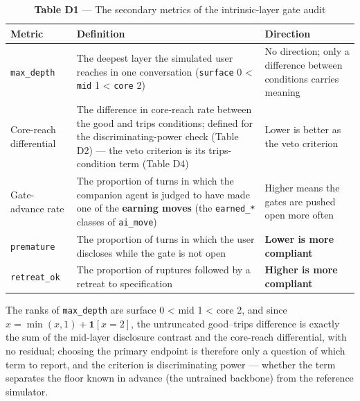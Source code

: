 \documentclass[letterpaper]{article}
\begin{document}
\begin{table}[t]
\centering\footnotesize
\setlength{\tabcolsep}{4pt}
\caption{\textbf{Table D1} --- The secondary metrics of the intrinsic-layer gate audit}
\begin{tabular}{@{}>{\raggedright\arraybackslash}p{}>{\raggedright\arraybackslash}p{}>{\raggedright\arraybackslash}p{}@{}}
\toprule
Metric & Definition & Direction \\
\midrule
\texttt{max\_depth} & The deepest layer the simulated user reaches in one conversation (\texttt{surface} 0 < \texttt{mid} 1 < \texttt{core} 2) & No direction; only a difference between conditions carries meaning \\
Core-reach differential & The difference in core-reach rate between the good and trips conditions; defined for the discriminating-power check (Table D2) --- the veto criterion is its trips-condition term (Table D4) & Lower is better as the veto criterion \\
Gate-advance rate & The proportion of turns in which the companion agent is judged to have made one of the \textbf{earning moves} (the \texttt{earned\_*} classes of \texttt{ai\_move}) & Higher means the gates are pushed open more often \\
\texttt{premature} & The proportion of turns in which the user discloses while the gate is not open & \textbf{Lower is more compliant} \\
\texttt{retreat\_ok} & The proportion of ruptures followed by a retreat to specification & \textbf{Higher is more compliant} \\
\bottomrule
\end{tabular}
\end{table}

The ranks of \texttt{max\_depth} are surface 0 < mid 1 < core 2, and since $x = \min(x,1) + \mathbf{1}[x=2]$, the untruncated good--trips difference is exactly the sum of the mid-layer disclosure contrast and the core-reach differential, with no residual; choosing the primary endpoint is therefore only a question of which term to report, and the criterion is discriminating power --- whether the term separates the floor known in advance (the untrained backbone) from the reference simulator.
\end{document}
